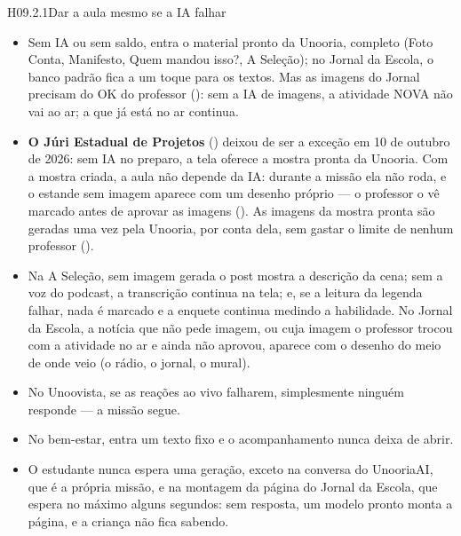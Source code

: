 \begin{historia}{H09.2.1}{Dar a aula mesmo se a IA falhar}{\pronto}
\aceite
\begin{itemize}
  \item Sem IA ou sem saldo, entra o material pronto da Unooria, completo
    (Foto Conta, Manifesto, Quem mandou isso?, A Seleção); no Jornal da Escola,
    o banco padrão fica a um toque para os textos. Mas as imagens do Jornal
    precisam do OK do professor (): sem a IA de imagens, a
    atividade NOVA não vai ao ar; a que já está no ar continua.
  \item \textbf{O Júri Estadual de Projetos} () deixou de ser a
    exceção em 10 de outubro de 2026: sem IA no preparo, a tela oferece a
    mostra pronta da Unooria. Com a mostra criada, a aula não depende da IA: durante a missão
    ela não roda, e o estande sem imagem aparece com um desenho próprio --- o
    professor o vê marcado antes de aprovar as imagens (). As
    imagens da mostra pronta são geradas uma vez pela Unooria, por conta dela,
    sem gastar o limite de nenhum professor ().
  \item Na A Seleção, sem imagem gerada o post mostra a descrição da cena; sem
    a voz do podcast, a transcrição continua na tela; e, se a leitura da
    legenda falhar, nada é marcado e a enquete continua medindo a habilidade.
    No Jornal da Escola, a notícia que não pede imagem, ou cuja imagem o
    professor trocou com a atividade no ar e ainda não aprovou, aparece com o
    desenho do meio de onde veio (o rádio, o jornal, o mural).
  \item No Unoovista, se as reações ao vivo falharem, simplesmente ninguém
    responde --- a missão segue.
  \item No bem-estar, entra um texto fixo e o acompanhamento nunca deixa de
    abrir.
  \item O estudante nunca espera uma geração, exceto na conversa do UnooriaAI,
    que é a própria missão, e na montagem da página do Jornal da Escola, que
    espera no máximo alguns segundos: sem resposta, um modelo pronto monta a
    página, e a criança não fica sabendo.
\end{itemize}
\end{historia}


